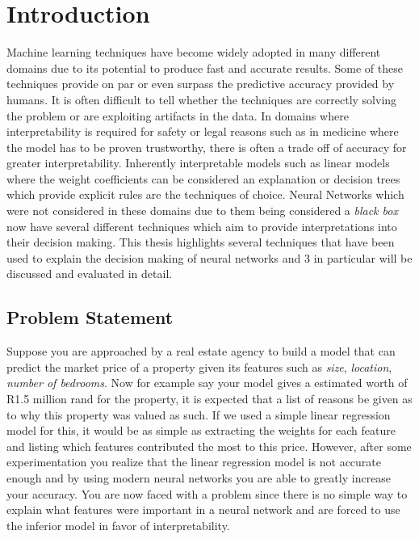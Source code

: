 \chapter{Introduction}

Machine learning techniques have become widely adopted in many different domains due to its potential to produce fast and accurate results. Some of these techniques provide on par or even surpass the predictive accuracy provided by humans. It is often difficult to tell whether the techniques are correctly solving the problem or are exploiting artifacts in the data. In domains where interpretability is required for safety or legal reasons such as in medicine \cite{10.1145/2783258.2788613} where the model has to be proven trustworthy, there is often a trade off of accuracy for greater interpretability. Inherently interpretable models such as linear models where the weight coefficients can be considered an explanation or decision trees \cite{articleb} which provide explicit rules are the techniques of choice. Neural Networks which were not considered in these domains due to them being considered a \emph{black box} now have several different techniques which aim to provide interpretations into their decision making. This thesis highlights several techniques that have been used to explain the decision making of neural networks and 3 in particular will be discussed and evaluated in detail.

\section{Problem Statement} \label{sect-intro-problem}
Suppose you are approached by a real estate agency to build a model that can predict the market price of a property given its features such as \emph{size}, \emph{location}, \emph{number of bedrooms}. Now for example say your model gives a estimated worth of R1.5 million rand for the property, it is expected that a list of reasons be given as to why this property was valued as such. If we used a simple linear regression model for this, it would be as simple as extracting the weights for each feature and listing which features contributed the most to this price. However, after some experimentation you realize that the linear regression model is not accurate enough and by using modern neural networks you are able to greatly increase your accuracy. You are now faced with a problem since there is no simple way to explain what features were important in a neural network and are forced to use the inferior model in favor of interpretability.

